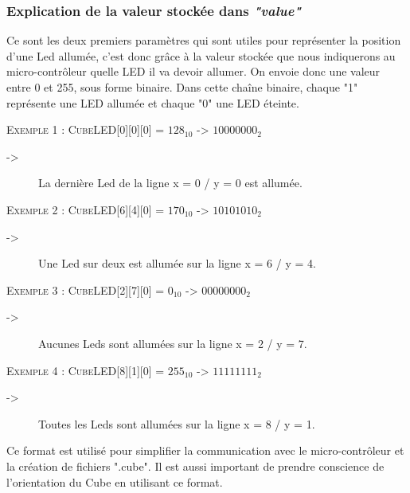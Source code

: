 \documentclass[a4paper,12pt]{article}
\begin{document}
\subsubsection{Explication de la valeur stockée dans \emph{"value"}}

\noindent Ce sont les deux premiers paramètres qui sont utiles pour représenter la position d'une Led allumée, c'est donc grâce à la valeur stockée que nous indiquerons au micro-contrôleur quelle LED il va devoir allumer. On envoie donc une valeur entre 0 et 255, sous forme binaire. Dans cette chaîne binaire, chaque "1" représente une LED allumée et chaque "0" une LED éteinte.
\vspace{1cm} 

\noindent \textsc{Exemple 1 : CubeLED}[0][0][0] = $128_{10}$ -> $10000000_2$ 
\begin{description}
	\item[->]La dernière Led de la ligne x = 0 / y = 0 est allumée.\\
\end{description}

\noindent \textsc{Exemple 2 : CubeLED}[6][4][0] = $170_{10}$ -> $10101010_2$ 
\begin{description}
	\item[->]Une Led sur deux est allumée sur la ligne x = 6 / y = 4.\\
\end{description}

\noindent \textsc{Exemple 3 : CubeLED}[2][7][0] = $0_{10}$ -> $00000000_2$ 
\begin{description}
	\item[->]Aucunes Leds sont allumées sur la ligne x = 2 / y = 7.\\
\end{description}

\noindent \textsc{Exemple 4 : CubeLED}[8][1][0] = $255_{10}$ -> $11111111_2$ 
\begin{description}
	\item[->]Toutes les Leds sont allumées sur la ligne x = 8 / y = 1.\\
\end{description}


\noindent Ce format est utilisé pour simplifier la communication avec le micro-contrôleur et la création de fichiers ".cube". Il est aussi important de prendre conscience de l’orientation du Cube en utilisant ce format.

\vspace{0.5cm}
\end{document}
